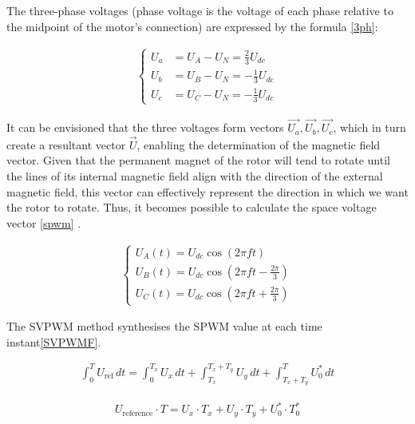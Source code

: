 The three-phase voltages (phase voltage is the voltage of each phase relative to the midpoint of the motor's connection) are expressed by the formula \ref{3ph}:

\begin{ceqn}
	\begin{align} \label{3ph}
		\begin{cases}
			U_a & = U_A - U_N = \frac{2}{3} U_{dc}  \\
			U_b & = U_B - U_N = -\frac{1}{3} U_{dc} \\
			U_c & = U_C - U_N = -\frac{1}{3} U_{dc}
		\end{cases}
	\end{align}
\end{ceqn}
It can be envisioned that the three voltages form vectors \(\vec{U_a}, \vec{U_b}, \vec{U_c}\), which in turn create a resultant vector \(\vec{U}\), enabling the determination of the magnetic field vector. Given that the permanent magnet of the rotor will tend to rotate until the lines of its internal magnetic field align with the direction of the external magnetic field, this vector can effectively represent the direction in which we want the rotor to rotate. Thus, it becomes possible to calculate the space voltage vector \ref{spwm} \citep{youtuFieldOriented}.

\begin{ceqn}
	\begin{align} \label{spwm}
		\begin{cases}
			U_A(t) = U_{dc}\cos(2\pi ft)                             \\
			U_B(t) = U_{dc}\cos\left(2\pi ft - \frac{2\pi}{3}\right) \\
			U_C(t) = U_{dc}\cos\left(2\pi ft + \frac{2\pi}{3}\right)
		\end{cases}
	\end{align}
\end{ceqn}


The SVPWM method synthesises the SPWM value at each time instant\ref{SVPWMF}.
\begin{ceqn}
	\begin{align} \label{SVPWMF}
		\int_0^T U_{\text{ref}} \, dt = \int_0^{T_x} U_x \, dt + \int_{T_x}^{T_x+T_y} U_y \, dt + \int_{T_x+T_y}^T U^*_0 \, dt
	\end{align}
\end{ceqn}

\begin{ceqn}
	\begin{align} \label{SVPWM}
		U_{\text{reference}} \cdot T = U_x \cdot T_x + U_y \cdot T_y + U_0^* \cdot T_0^*
	\end{align}
\end{ceqn}

